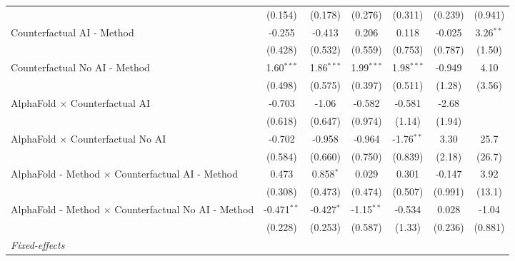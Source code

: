 \begin{tabular}{lcccccc}
                                                              & (0.154)        & (0.178)        & (0.276)      & (0.311)      & (0.239)       & (0.941)\\   
   Counterfactual AI - Method                                 & -0.255         & -0.413         & 0.206        & 0.118        & -0.025        & 3.26$^{**}$\\   
                                                              & (0.428)        & (0.532)        & (0.559)      & (0.753)      & (0.787)       & (1.50)\\   
   Counterfactual No AI - Method                              & 1.60$^{***}$   & 1.86$^{***}$   & 1.99$^{***}$ & 1.98$^{***}$ & -0.949        & 4.10\\   
                                                              & (0.498)        & (0.575)        & (0.397)      & (0.511)      & (1.28)        & (3.56)\\   
   AlphaFold $\times$ Counterfactual AI                       & -0.703         & -1.06          & -0.582       & -0.581       & -2.68         &   \\   
                                                              & (0.618)        & (0.647)        & (0.974)      & (1.14)       & (1.94)        &   \\   
   AlphaFold $\times$ Counterfactual No AI                    & -0.702         & -0.958         & -0.964       & -1.76$^{**}$ & 3.30          & 25.7\\   
                                                              & (0.584)        & (0.660)        & (0.750)      & (0.839)      & (2.18)        & (26.7)\\   
   AlphaFold - Method $\times$ Counterfactual AI - Method     & 0.473          & 0.858$^{*}$    & 0.029        & 0.301        & -0.147        & 3.92\\   
                                                              & (0.308)        & (0.473)        & (0.474)      & (0.507)      & (0.991)       & (13.1)\\   
   AlphaFold - Method $\times$ Counterfactual No AI - Method  & -0.471$^{**}$  & -0.427$^{*}$   & -1.15$^{**}$ & -0.534       & 0.028         & -1.04\\   
                                                              & (0.228)        & (0.253)        & (0.587)      & (1.33)       & (0.236)       & (0.881)\\   
   \midrule
   \emph{Fixed-effects}\\

\end{tabular}

